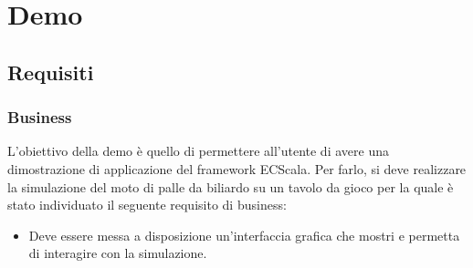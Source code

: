 \chapter{Demo}\label{ch:demo}

\section{Requisiti}\label{sec:demo-requisiti}

\subsection{Business}\label{subsec:demo-business}
L'obiettivo della demo è quello di permettere all'utente di avere una dimostrazione di applicazione del framework ECScala.
Per farlo, si deve realizzare la simulazione del moto di palle da biliardo su un tavolo da gioco per la quale è
stato individuato il seguente requisito di business:
\begin{itemize}
    \item Deve essere messa a disposizione un'interfaccia grafica che mostri e permetta di interagire con la simulazione.
\end{itemize}

